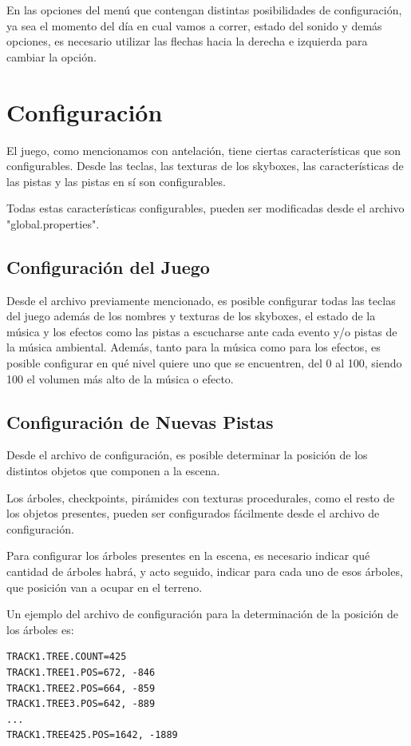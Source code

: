 \documentclass[a4paper,11pt]{article}
\begin{document}
En las opciones del menú que contengan distintas posibilidades de
configuración, ya sea el momento del día en cual vamos a correr, estado del
sonido y demás opciones, es necesario utilizar las flechas hacia la derecha e
izquierda para cambiar la opción.
\section{Configuración}
\label{configuracion}
El juego, como mencionamos con antelación, tiene ciertas características que
son configurables.  Desde las teclas, las texturas de los skyboxes, las
características de las pistas y las pistas en sí son configurables.

Todas estas características configurables, pueden ser modificadas desde el
archivo "global.properties".

\subsection{Configuración del Juego}

Desde el archivo previamente mencionado, es posible configurar todas las teclas
del juego además de los nombres y texturas de los skyboxes, el estado de la
música y los efectos como las pistas a escucharse ante cada evento y/o pistas
de la música ambiental.  Además, tanto para la música como para los efectos, es
posible configurar en qué nivel quiere uno que se encuentren, del 0 al 100,
siendo 100 el volumen más alto de la música o efecto.

\subsection{Configuración de Nuevas Pistas}

Desde el archivo de configuración, es posible determinar la posición de los
distintos objetos que componen a la escena.

Los árboles, checkpoints, pirámides con texturas procedurales, como el resto de
los objetos presentes, pueden ser configurados fácilmente desde el archivo de
configuración.

Para configurar los árboles presentes en la escena, es necesario indicar qué
cantidad de árboles habrá, y acto seguido, indicar para cada uno de esos
árboles, que posición van a ocupar en el terreno.

Un ejemplo del archivo de configuración para la determinación de la posición de
los árboles es:

\begin{verbatim}
TRACK1.TREE.COUNT=425
TRACK1.TREE1.POS=672, -846
TRACK1.TREE2.POS=664, -859
TRACK1.TREE3.POS=642, -889
...
TRACK1.TREE425.POS=1642, -1889
\end{verbatim}
\end{document}
